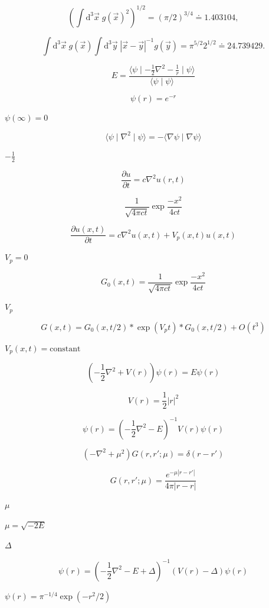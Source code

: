 \documentclass{article}
\begin{document}
\[   \left( \int \mathrm{d}^3 \vec{x} \; g(\vec{x})^2 \right)^{1/2} = (\pi/2)^{3/4} \doteq 1.403104,
\]
\pagebreak

\[   \int \mathrm{d}^3 \vec{x} \; g(\vec{x}) \int \mathrm{d}^3 \vec{y} \; |\vec{x}-\vec{y}|^{-1} g(\vec{y}) = \pi^{5/2} 2^{1/2} \doteq 24.739429.
\]
\pagebreak

\[    E = \frac{\langle \psi \mid - \frac{1}{2}  \nabla^2  - \frac{1}{r} \mid \psi \rangle}{\langle \psi \mid \psi \rangle}
\]
\pagebreak

\[   \psi(r) = e^{-r}
\]
\pagebreak

$ \psi(\infty)=0 $
\pagebreak

\[     \langle \psi \mid \nabla^2 \mid \psi \rangle = - \langle \nabla \psi \mid \nabla \psi \rangle
\]
\pagebreak

$-\frac{1}{2}$
\pagebreak

\[\frac{\partial u}{\partial t} = c \nabla^2 u(r,t)
\]
\pagebreak

\[\frac{1}{\sqrt{4 \pi c t}}  \exp \frac{-x^2}{4 c t}
\]
\pagebreak

\[  \frac{\partial u(x,t)}{\partial t} = c \nabla^2 u(x,t) + V_p(x,t) u(x,t)
\]
\pagebreak

$ V_p = 0 $
\pagebreak

\[  G_0(x,t) = \frac{1}{\sqrt{4 \pi c t}} \exp \frac{-x^2}{4 c t}
\]
\pagebreak

$ V_p $
\pagebreak

\[  G(x,t) = G_0(x,t/2) * \exp(V_p t) * G_0(x,t/2) + O(t^3)
\]
\pagebreak

$ V_p(x,t)=\mbox{constant} $
\pagebreak

\[\left( -\frac{1}{2} \nabla^2 + V(r) \right) \psi(r) = E \psi(r)
\]
\pagebreak

\[V(r) = \frac{1}{2} |r|^2
\]
\pagebreak

\[\psi(r) = \left( -\frac{1}{2} \nabla^2 - E \right)^{-1} V(r) \psi(r)
\]
\pagebreak

\[\left(-\nabla^2 + \mu^2 \right) G(r,r'; \mu) = \delta(r-r')
\]
\pagebreak

\[G(r,r'; \mu) = \frac{e^{-\mu |r-r'|}}{4 \pi |r-r|}
\]
\pagebreak

$\mu$
\pagebreak

$\mu = \sqrt{-2 E}$
\pagebreak

$\Delta$
\pagebreak

\[\psi(r) = \left( -\frac{1}{2} \nabla^2 - E + \Delta \right)^{-1} \left( V(r) -\Delta\right)  \psi(r)
\]
\pagebreak

$\psi(r)=\pi^{-1/4}\exp(-r^2 / 2)$
\pagebreak
\end{document}
